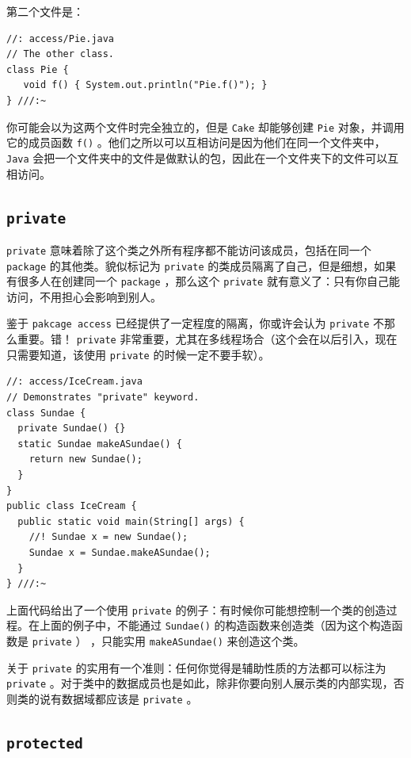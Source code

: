 \documentclass[10pt,a4paper,UTF8]{article}
\begin{document}
第二个文件是：
\lstset{language=C,label= ,caption= ,captionpos=b,numbers=none}
\begin{lstlisting}
//: access/Pie.java
// The other class.
class Pie {
   void f() { System.out.println("Pie.f()"); }
} ///:~
\end{lstlisting}

你可能会以为这两个文件时完全独立的，但是 \texttt{Cake} 却能够创建 \texttt{Pie} 对象，并调用它的成员函数 \texttt{f()} 。他们之所以可以互相访问是因为他们在同一个文件夹中， \texttt{Java} 会把一个文件夹中的文件是做默认的包，因此在一个文件夹下的文件可以互相访问。
\subsection{\texttt{private}}
\label{sec:orgf1fe541}


\texttt{private} 意味着除了这个类之外所有程序都不能访问该成员，包括在同一个 \texttt{package}  的其他类。貌似标记为 \texttt{private} 的类成员隔离了自己，但是细想，如果有很多人在创建同一个 \texttt{package} ，那么这个 \texttt{private} 就有意义了：只有你自己能访问，不用担心会影响到别人。

鉴于 \texttt{pakcage access} 已经提供了一定程度的隔离，你或许会认为 \texttt{private} 不那么重要。错！ \texttt{private} 非常重要，尤其在多线程场合（这个会在以后引入，现在只需要知道，该使用 \texttt{private} 的时候一定不要手软）。

\lstset{language=C,label= ,caption= ,captionpos=b,numbers=none}
\begin{lstlisting}
//: access/IceCream.java
// Demonstrates "private" keyword.
class Sundae {
  private Sundae() {}
  static Sundae makeASundae() {
    return new Sundae();
  }
}
public class IceCream {
  public static void main(String[] args) {
    //! Sundae x = new Sundae();
    Sundae x = Sundae.makeASundae();
  }
} ///:~
\end{lstlisting}

上面代码给出了一个使用 \texttt{private} 的例子：有时候你可能想控制一个类的创造过程。在上面的例子中，不能通过 \texttt{Sundae()} 的构造函数来创造类（因为这个构造函数是 \texttt{private} ） ，只能实用 \texttt{makeASundae()} 来创造这个类。

关于 \texttt{private} 的实用有一个准则：任何你觉得是辅助性质的方法都可以标注为 \texttt{private} 。对于类中的数据成员也是如此，除非你要向别人展示类的内部实现，否则类的说有数据域都应该是 \texttt{private} 。
\subsection{\texttt{protected}}
\label{sec:org1f7c1ec}
\end{document}
